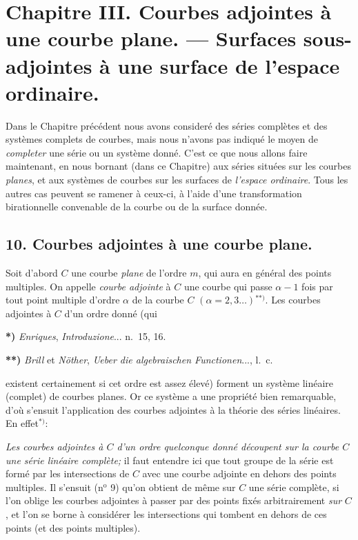 \documentclass{article}
\begin{document}
\section*{Chapitre III. Courbes adjointes à une courbe plane. --- Surfaces sous-adjointes à une surface de l'espace ordinaire.}

Dans le Chapitre précédent nous avons consideré des séries complètes et des systèmes complets de courbes, mais nous n'avons pas indiqué le moyen de \emph{completer} une série ou un système donné. C'est ce que nous allons faire maintenant, en nous bornant (dans ce Chapitre) aux séries situées sur les courbes \emph{planes}, et aux systèmes de courbes sur les surfaces de \emph{l'espace ordinaire}. Tous les autres cas peuvent se ramener à ceux-ci, à l'aide d'une transformation birationnelle convenable de la courbe ou de la surface donnée.

\subsection*{10. Courbes adjointes à une courbe plane.}

Soit d'abord $C$ une courbe \emph{plane} de l'ordre $m$, qui aura en général des points multiples. On appelle \emph{courbe adjointe} à $C$ une courbe qui passe $\alpha - 1$ fois par tout point multiple d'ordre $\alpha$ de la courbe $C$ $(\alpha = 2, 3 \ldots)$${}^{**)}$. Les courbes adjointes à $C$ d'un ordre donné (qui

\textbf{*)} \emph{Enriques}, \emph{Introduzione}... n.\ 15, 16.

\textbf{**)} \emph{Brill} et \emph{Nöther}, \emph{Ueber die algebraischen Functionen}..., l.\ c.

existent certainement si cet ordre est assez élevé) forment un système linéaire (complet) de courbes planes. Or ce système a une propriété bien remarquable, d'où s'ensuit l'application des courbes adjointes à la théorie des séries linéaires. En effet${}^{*)}$:

\emph{Les courbes adjointes à $C$ d'un ordre quelconque donné découpent sur la courbe $C$ une série linéaire complète;} il faut entendre ici que tout groupe de la série est formé par les intersections de $C$ avec une courbe adjointe en dehors des points multiples. Il s'ensuit (n${}^{\text{o}}$ 9) qu'on obtient de même sur $C$ une série complète, si l'on oblige les courbes adjointes à passer par des points fixés arbitrairement \emph{sur} $C$, et l'on se borne à considérer les intersections qui tombent en dehors de ces points (et des points multiples).
\end{document}
